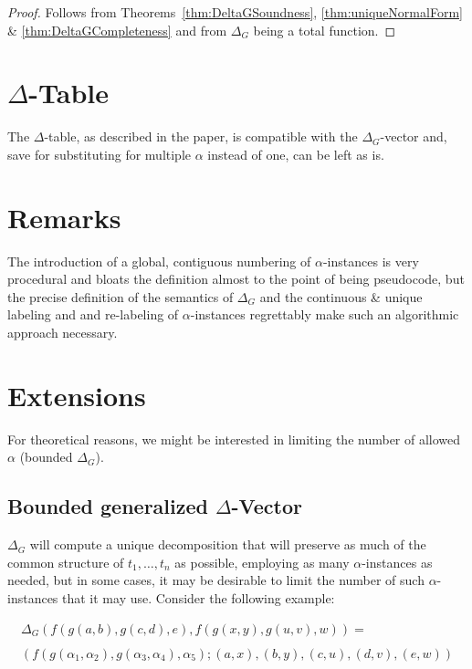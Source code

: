 \documentclass[a4paper, 11pt]{report}
\begin{document}
\begin{proof}
  Follows from Theorems~\ref{thm:DeltaGSoundness}, \ref{thm:uniqueNormalForm} \& \ref{thm:DeltaGCompleteness} and from $\Delta_G$ being a total function.
\end{proof}


\section{$\Delta$-Table}

The $\Delta$-table, as described in the paper, is compatible with the $\Delta_G$-vector and, save for substituting for multiple $\alpha$ instead of one, can be left as is. 

\section{Remarks}

The introduction of a global, contiguous numbering of $\alpha$-instances is very procedural and bloats the definition almost to the point of being pseudocode, but the precise definition of the semantics of $\Delta_G$ and the continuous \& unique labeling and and re-labeling of $\alpha$-instances regrettably make such an algorithmic approach necessary.\\

\section{Extensions}

For theoretical reasons, we might be interested in limiting the number of allowed $\alpha$ (bounded $\Delta_G$).

\subsection{Bounded generalized $\Delta$-Vector}

$\Delta_G$ will compute a unique decomposition that will preserve as much of the common structure of $t_1,\dots,t_n$ as possible, employing as many $\alpha$-instances as needed, but in some cases, it may be desirable to limit the number of such $\alpha$-instances that it may use.
Consider the following example:

$$
\begin{array}{l}
\Delta_G(f(g(a,b),g(c,d),e), f(g(x,y),g(u,v),w)) =\\
\\
(f(g(\alpha_1,\alpha_2),g(\alpha_3,\alpha_4),\alpha_5); (a,x), (b,y), (c,u), (d,v), (e,w))
\end{array}
$$
\end{document}
